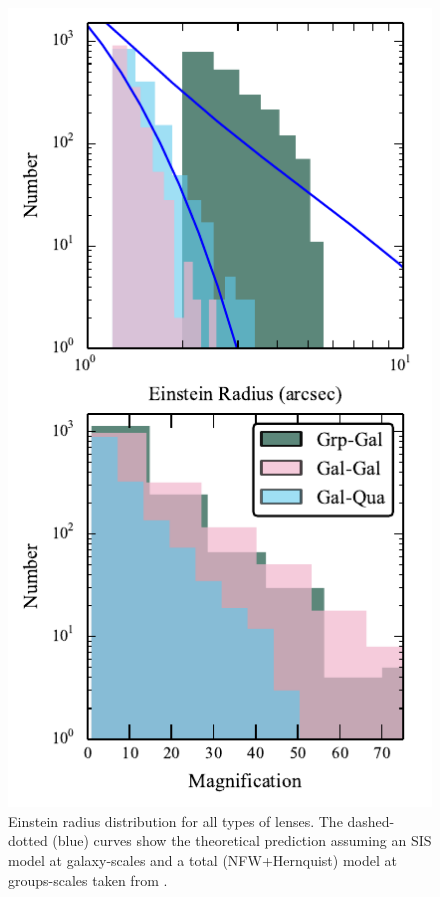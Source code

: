 \documentclass[useAMS,usenatbib,a4paper]{mn2e}
\begin{document}
\begin{figure}
\begin{center}
\includegraphics[scale=1.2]{sw-cfhtls-figs/distrib_remu.pdf}
\caption{ \label{fig:remudist}
Einstein radius distribution for all types of lenses. The dashed-dotted (blue)
curves show the theoretical prediction assuming an SIS model at galaxy-scales
and a total (NFW+Hernquist) model at groups-scales taken from \citep{More2012}.
}
\end{center}
\end{figure}
\end{document}
